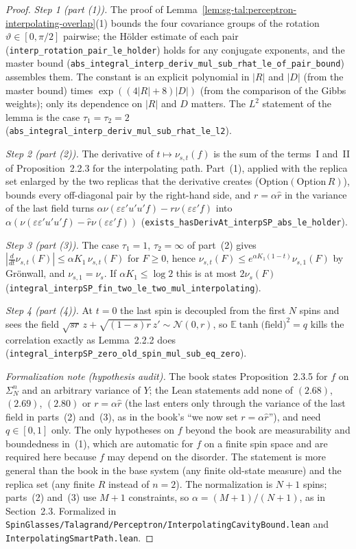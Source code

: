 \begin{proof}
  \leanok
\emph{Step 1 (part (1)).} The proof of Lemma~\ref{lem:sg-tal:perceptron-interpolating-overlap}(1) bounds the
four covariance groups of the rotation $\vartheta\in[0,\pi/2]$ pairwise; the H\"older estimate of each pair
(\texttt{interp\_rotation\_pair\_le\_holder}) holds for any conjugate exponents, and the master bound
(\texttt{abs\_integral\_interp\_deriv\_mul\_sub\_rhat\_le\_of\_pair\_bound}) assembles them. The constant is
an explicit polynomial in $|R|$ and $|D|$ (from the master bound) times $\exp((4|R|+8)|D|)$ (from the
comparison of the Gibbs weights); only its dependence on $|R|$ and $D$ matters.
The $L^2$ statement of the lemma is the case $\tau_1=\tau_2=2$ (\texttt{abs\_integral\_interp\_deriv\_mul\_sub\_rhat\_le\_l2}).

\emph{Step 2 (part (2)).} The derivative of $t\mapsto\nu_{s,t}(f)$ is the sum of the terms~I and~II of
Proposition~2.2.3 for the interpolating path. Part~(1), applied with the replica set enlarged by the two
replicas that the derivative creates ($\mathrm{Option}(\mathrm{Option}\,R)$), bounds every off-diagonal pair
by the right-hand side, and $r=\alpha\widehat r$ in the variance of the last field turns
$\alpha\nu(\varepsilon\varepsilon' u'u' f)-r\nu(\varepsilon\varepsilon' f)$ into
$\alpha(\nu(\varepsilon\varepsilon' u'u' f)-\widehat r\nu(\varepsilon\varepsilon' f))$
(\texttt{exists\_hasDerivAt\_interpSP\_abs\_le\_holder}).

\emph{Step 3 (part (3)).} The case $\tau_1=1$, $\tau_2=\infty$ of part~(2) gives
$|\tfrac{d}{dt}\nu_{s,t}(F)|\le\alpha K_1\,\nu_{s,t}(F)$ for $F\ge0$, hence
$\nu_{s,t}(F)\le e^{\alpha K_1(1-t)}\nu_{s,1}(F)$ by Gr\"onwall, and $\nu_{s,1}=\nu_s$. If $\alpha K_1\le\log 2$ this
is at most $2\nu_s(F)$ (\texttt{integral\_interpSP\_fin\_two\_le\_two\_mul\_interpolating}).

\emph{Step 4 (part (4)).} At $t=0$ the last spin is decoupled from the first $N$ spins and sees the field
$\sqrt{s r}\,z+\sqrt{(1-s)r}\,z'\sim\mathcal N(0,r)$, so $\mathbb E\tanh\bigl(\text{field}\bigr)^2=q$ kills the
correlation exactly as Lemma~2.2.2 does (\texttt{integral\_interpSP\_zero\_old\_spin\_mul\_sub\_eq\_zero}).

\emph{Formalization note (hypothesis audit).} The book states Proposition~2.3.5 for
$f$ on $\Sigma_N^n$ and an arbitrary variance of $Y$; the Lean statements add none of
$(2.68)$, $(2.69)$, $(2.80)$ or $r=\alpha\widehat r$ (the last enters only through the variance of the last
field in parts~(2) and~(3), as in the book's ``we now set $r=\alpha\widehat r$''), and need $q\in[0,1]$ only.
The only hypotheses on $f$ beyond the book are measurability and boundedness in~(1), which are automatic
for $f$ on a finite spin space and are required here because $f$ may depend on the disorder.
The statement is more general than the book in the base system (any finite old-state measure) and the replica
set (any finite $R$ instead of $n=2$). The normalization is $N+1$ spins; parts~(2) and~(3) use $M+1$ constraints, so
$\alpha=(M+1)/(N+1)$, as in Section~2.3.
Formalized in \texttt{SpinGlasses/Talagrand/Perceptron/InterpolatingCavityBound.lean} and
\texttt{InterpolatingSmartPath.lean}.
\end{proof}

